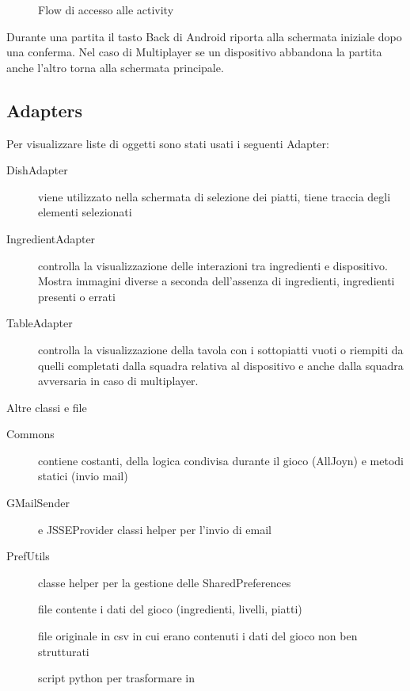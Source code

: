 \begin{figure}[h!]
\caption{Flow di accesso alle activity}
\label{fig:flow}
\end{figure}


Durante una partita il tasto Back di Android riporta alla schermata iniziale dopo una conferma. Nel caso di Multiplayer se un dispositivo abbandona la partita anche l’altro torna alla schermata principale.


\subsection{Adapters}

Per visualizzare liste di oggetti sono stati usati i seguenti Adapter:
\begin{description}
\item[DishAdapter] viene utilizzato nella schermata di selezione dei piatti, tiene traccia degli elementi selezionati

\item[IngredientAdapter] controlla la visualizzazione delle interazioni tra ingredienti e dispositivo. Mostra immagini diverse a seconda dell’assenza di ingredienti, ingredienti presenti o errati

\item[TableAdapter] controlla la visualizzazione della tavola con i sottopiatti vuoti o riempiti da quelli completati dalla squadra relativa al dispositivo e anche dalla squadra avversaria in caso di multiplayer.
\end{description}

Altre classi e file
\begin{description}
\item[Commons] contiene costanti, della logica condivisa durante il gioco (AllJoyn) e metodi statici (invio mail)

\item[GMailSender] e JSSEProvider classi helper per l’invio di email

\item[PrefUtils] classe helper per la gestione delle SharedPreferences

\item[] file contente i dati del gioco (ingredienti, livelli, piatti)

\item[] file originale in csv in cui erano contenuti i dati del gioco non ben strutturati

\item[] script python per trasformare  in 
\end{description}
